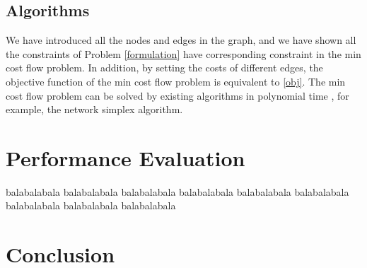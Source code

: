 \documentclass[conference, 10pt, ﬁnal, letterpaper, twocolumn]{IEEEtran}
\begin{document}
\subsection{Algorithms}

We have introduced all the nodes and edges in the graph, and we have shown all the constraints of Problem \eqref{formulation} have corresponding constraint in the min cost flow problem. In addition, by setting the costs of different edges, the objective function of the min cost flow problem is equivalent to \eqref{obj}. The min cost flow problem can be solved by existing algorithms in polynomial time \cite{10.5555/137406}, for example, the network simplex algorithm.

\section{Performance Evaluation}







balabalabala
balabalabala
balabalabala
balabalabala
balabalabala
balabalabala
balabalabala
balabalabala
balabalabala

\section{Conclusion} \label{Sec:conclusion}




\end{document}
